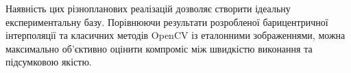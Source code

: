 Наявність цих різнопланових реалізацій дозволяє створити ідеальну експериментальну базу. Порівнюючи результати розробленої барицентричної інтерполяції та класичних методів OpenCV із еталонними зображеннями, можна максимально об'єктивно оцінити компроміс між швидкістю виконання та підсумковою якістю.